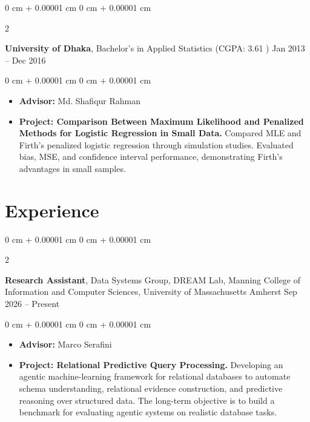 \documentclass[10pt, letterpaper]{article}
\newenvironment{highlights}{
    \begin{itemize}[
        topsep=0.10 cm,
        parsep=0.10 cm,
        partopsep=0pt,
        itemsep=0pt,
        leftmargin=0 cm + 10pt
    ]
}{
    \end{itemize}
} %
\newenvironment{onecolentry}{
    \begin{adjustwidth}{
        0 cm + 0.00001 cm
    }{
        0 cm + 0.00001 cm
    }
}{
    \end{adjustwidth}
} %
\newenvironment{twocolentry}[2][]{
    \onecolentry
    \def\secondColumn{#2}
    \setcolumnwidth{\fill, 4.5 cm}
    \begin{paracol}{2}
}{
    \switchcolumn \raggedleft \secondColumn
    \end{paracol}
    \endonecolentry
} %
\begin{document}
    \vspace{0.25 cm}
    \begin{twocolentry}{
            Jan 2013 – Dec 2016
        }
            \textbf{University of Dhaka}, Bachelor's in Applied Statistics (CGPA: 3.61 )\end{twocolentry}
        \vspace{0.10 cm}
        \begin{onecolentry}
            \begin{highlights}
                \item \textbf{Advisor:} Md. Shafiqur Rahman
                \item \textbf{Project: Comparison Between Maximum Likelihood and Penalized Methods for Logistic Regression in Small Data.} Compared MLE and Firth's penalized logistic regression through simulation studies. Evaluated bias, MSE, and confidence interval performance, demonstrating Firth's advantages in small samples.
            \end{highlights}
        \end{onecolentry}

    \vspace{0.25 cm}
    \section{Experience}

        \begin{twocolentry}{
            Sep 2026 – Present
        }
            \textbf{Research Assistant}, Data Systems Group, DREAM Lab, Manning College of Information and Computer Sciences, University of Massachusetts Amherst \end{twocolentry}

        \vspace{0.10 cm}
        \begin{onecolentry}
            \begin{highlights}
                \item \textbf{Advisor:} Marco Serafini
                \item \textbf{Project: Relational Predictive Query Processing.} Developing an agentic machine-learning framework for relational databases to automate schema understanding, relational evidence construction, and predictive reasoning over structured data. The long-term objective is to build a benchmark for evaluating agentic systems on realistic database tasks.
            \end{highlights}
        \end{onecolentry}
\end{document}

